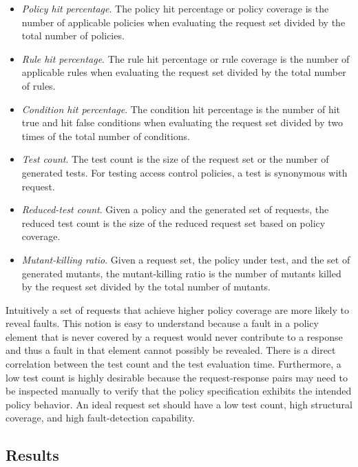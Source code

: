 \begin{itemize}

\item \emph{Policy hit percentage}. The policy hit percentage or
policy coverage is the number of applicable policies when evaluating
the request set divided by the total number of policies.

\item \emph{Rule hit percentage}. The rule hit percentage or rule
coverage is the number of applicable rules when evaluating the
request set divided by the total number of rules.

\item \emph{Condition hit percentage}. The condition hit percentage
is the number of hit true and hit false conditions when evaluating
the request set divided by two times of the total number of
conditions.

\item \emph{Test count}. The test count is the size of the request
set or the number of generated tests.  For testing access control
policies, a test is synonymous with request.

\item \emph{Reduced-test count}. Given a policy and the generated set
of requests, the reduced test count is the size of the reduced
request set based on policy coverage.

\item \emph{Mutant-killing ratio}. Given a request set, the policy
under test, and the set of generated mutants, the mutant-killing
ratio is the number of mutants killed by the request set divided by
the total number of mutants.

\end{itemize}

Intuitively a set of requests that achieve higher policy coverage
are more likely to reveal faults. This notion is easy to understand
because a fault in a policy element that is never covered by a
request would never contribute to a response and thus a fault in
that element cannot possibly be revealed. There is a direct
correlation between the test count and the test evaluation time.
Furthermore, a low test count is highly desirable because the
request-response pairs may need to be inspected manually to verify
that the policy specification exhibits the intended policy behavior.
An ideal request set should have a low test count, high structural
coverage, and high fault-detection capability.

\subsection{Results}

